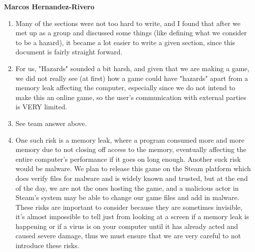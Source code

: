 \documentclass{article}
\begin{document}
\textbf{Marcos Hernandez-Rivero}
\begin{enumerate}
\item{Many of the sections were not too hard to write, and I found that after we met up as a group and discussed some things (like defining what we consider to be a hazard), it became a lot easier to write a given section, since this document is fairly straight forward.}
\item{For us, "Hazards" sounded a bit harsh, and given that we are making a game, we did not really see (at first) how a game could have "hazards" apart from a memory leak affecting the computer, especially since we do not intend to make this an online game, so the user's communication with external parties is VERY limited.}
\item{See team answer above.}
\item{One such risk is a memory leak, where a program consumed more and more memory due to not closing off access to the memory, eventually affecting the entire computer's performance if it goes on long enough. Another suck risk would be malware. We plan to release this game on the Steam platform which does verify files for malware and is widely known and trusted, but at the end of the day, we are not the ones hosting the game, and a malicious actor in Steam's system may be able to change our game files and add in malware. These risks are important to consider because they are sometimes invisible, it's almost impossible to tell just from looking at a screen if a memory leak is happening or if a virus is on your computer until it has already acted and caused severe damage, thus we must ensure that we are very careful to not introduce these risks.}
\end{enumerate}
\end{document}
